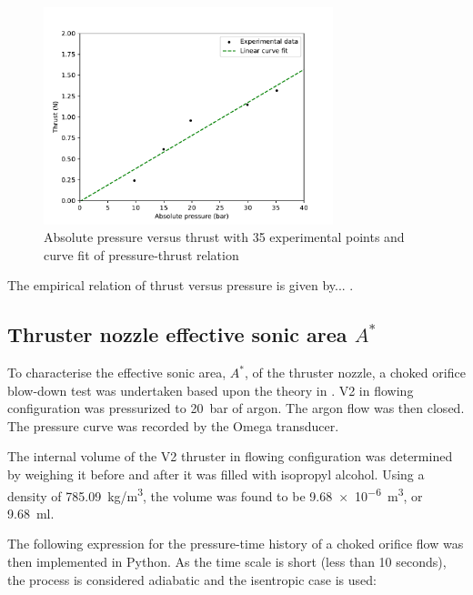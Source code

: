             \begin{figure}[!ht]
                \centering
                \includegraphics[width=0.75\textwidth]{assets/4 experiments/pressure-thrust graph.pdf}
                \caption{Absolute pressure versus thrust with 35 experimental points and curve fit of pressure-thrust relation}
                \label{fig:coldflow pressure-thrust}
            \end{figure}

            The empirical relation of thrust versus pressure is given by... .

        \subsection{Thruster nozzle effective sonic area $A^*$}

            To characterise the effective sonic area, $A^*$, of the thruster nozzle, a choked orifice blow-down test was undertaken based upon the theory in \textcite{saadCompressibleFluidFlow}. V2 in flowing configuration was pressurized to \qty{20}{bar} of argon. The argon flow was then closed. The pressure curve was recorded by the Omega  transducer.


            The internal volume of the V2 thruster in flowing configuration was determined by weighing it before and after it was filled with isopropyl alcohol. Using a density of \qty{785.09}{kg/m^3}, the volume was found to be \qty{9.68e-6}{m^3}, or \qty{9.68}{ml}.

            The following expression for the pressure-time history  of a choked orifice flow \cite{saadCompressibleFluidFlow} was then implemented in Python. As the time scale is short (less than 10 seconds), the process is considered adiabatic and the isentropic case is used:

